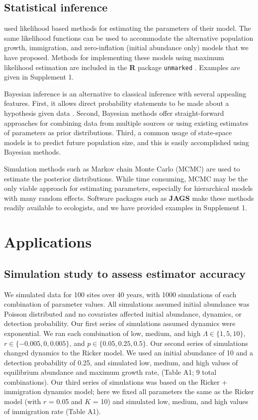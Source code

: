 \documentclass[12pt,english]{article}
\begin{document}
\begin{spacing}{1.9}
\begin{flushleft}
\subsection*{Statistical inference}

\citet{dail_madsen:2011} used likelihood based methods for estimating
the parameters of their model. The same likelihood functions can be
used to accommodate the alternative population growth, immigration, and 
zero-inflation (initial abundance only) models that we
have proposed. Methods for implementing these models using maximum 
likelihood estimation are included in the 
\textbf{R} package \texttt{unmarked} \citep{fiske_chandler:2011}. Examples
are given in Supplement 1.

Bayesian inference is an alternative to classical inference with
several appealing features. First, it allows direct probability
statements to be made about a hypothesis given data
\citep{link_barker:2010}.  Second, Bayesian methods offer
straight-forward approaches for combining data from multiple sources
or using existing estimates of parameters as prior distributions. Third,
a common usage of state-space models is to predict future
population size, and this is easily accomplished using Bayesian
methods.

Simulation methods such as Markov chain Monte Carlo (MCMC)
are used to estimate the posterior distributions. While time 
consuming, MCMC may be the only viable approach for estimating
parameters, especially for hierarchical models with many random
effects.  
Software packages such as 
\textbf{JAGS} \citep{plummer:2003} make these methods readily
available to ecologists, and we have provided examples in 
Supplement 1. 


\section*{Applications}
\label{sec:app}

\subsection*{Simulation study to assess estimator accuracy}


We simulated data for 100 sites over 40 years, with 1000 simulations of 
each combination of parameter values.  All
simulations assumed initial abundance was Poisson distributed
and no covariates affected initial abundance, dynamics, or
detection probability.  Our first series of simulations
assumed dynamics were exponential.  We ran 
each combination of low, medium, and high $\Lambda \in
\{1,5,10\}$, $r \in \{-0.005, 0, 0.005\}$, and
$p \in \{0.05, 0.25, 0.5\}$. 
Our second series of simulations changed dynamics to the Ricker
model. We used an initial abundance of 10 and a detection probability
of 0.25, and simulated low, medium, and high values of equilibrium
abundance and maximum growth rate, (Table A1;
9 total combinations). Our third series of simulations was based
on the Ricker + immigration dynamics model; here we fixed all
parameters the same as the Ricker model (with $r$ = 0.05 and $K$ = 10) and
simulated low, medium, and high values of immigration rate (Table A1).


\end{flushleft}
\end{spacing}
\end{document}
